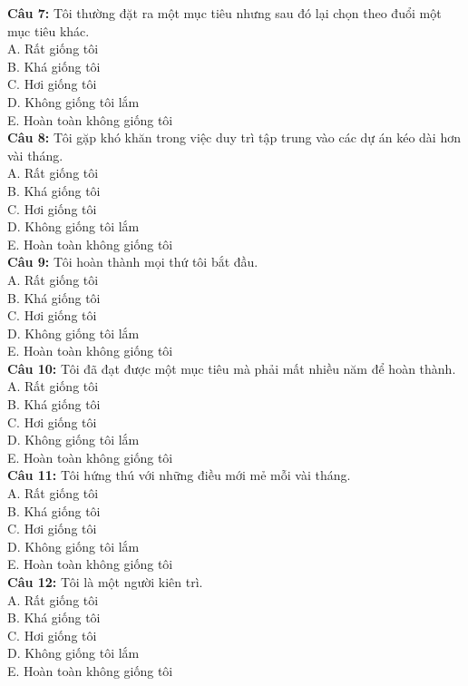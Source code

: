 \begin{multicols}{2}
\textbf{Câu 7:} Tôi thường đặt ra một mục tiêu nhưng sau đó lại chọn theo đuổi một mục tiêu khác. \\
A. Rất giống tôi \\
B. Khá giống tôi \\
C. Hơi giống tôi \\
D. Không giống tôi lắm \\
E. Hoàn toàn không giống tôi \\

\textbf{Câu 8:} Tôi gặp khó khăn trong việc duy trì tập trung vào các dự án kéo dài hơn vài tháng. \\
A. Rất giống tôi \\
B. Khá giống tôi \\
C. Hơi giống tôi \\
D. Không giống tôi lắm \\
E. Hoàn toàn không giống tôi \\

\textbf{Câu 9:} Tôi hoàn thành mọi thứ tôi bắt đầu. \\
A. Rất giống tôi \\
B. Khá giống tôi \\
C. Hơi giống tôi \\
D. Không giống tôi lắm \\
E. Hoàn toàn không giống tôi \\

\textbf{Câu 10:} Tôi đã đạt được một mục tiêu mà phải mất nhiều năm để hoàn thành. \\
A. Rất giống tôi \\
B. Khá giống tôi \\
C. Hơi giống tôi \\
D. Không giống tôi lắm \\
E. Hoàn toàn không giống tôi \\

\textbf{Câu 11:} Tôi hứng thú với những điều mới mẻ mỗi vài tháng. \\
A. Rất giống tôi \\
B. Khá giống tôi \\
C. Hơi giống tôi \\
D. Không giống tôi lắm \\
E. Hoàn toàn không giống tôi \\

\textbf{Câu 12:} Tôi là một người kiên trì. \\
A. Rất giống tôi \\
B. Khá giống tôi \\
C. Hơi giống tôi \\
D. Không giống tôi lắm \\
E. Hoàn toàn không giống tôi \\

\end{multicols}


